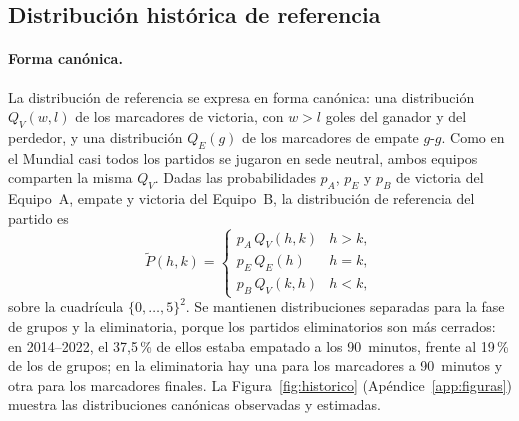 \documentclass[12pt]{article}
\theoremstyle{plain}
\theoremstyle{remark}
\begin{document}
\subsection{Distribución histórica de referencia}
\label{sec:historico}

\paragraph{Forma canónica.}
La distribución de referencia se expresa en forma canónica: una
distribución $Q_V(w, l)$ de los marcadores de victoria, con $w > l$
goles del ganador y del perdedor, y una distribución $Q_E(g)$ de los
marcadores de empate $g$-$g$.
Como en el Mundial casi todos los partidos se jugaron en sede neutral,
ambos equipos comparten la misma $Q_V$.
Dadas las probabilidades $p_A$, $p_E$ y $p_B$ de victoria del
Equipo~A, empate y victoria del Equipo~B, la distribución de
referencia del partido es
\begin{equation}
  \tilde{P}(h, k) =
  \begin{cases}
    p_A \, Q_V(h, k) & h > k, \\
    p_E \, Q_E(h)    & h = k, \\
    p_B \, Q_V(k, h) & h < k,
  \end{cases}
  \label{eq:referencia}
\end{equation}
sobre la cuadrícula $\{0, \ldots, 5\}^2$.
Se mantienen distribuciones separadas para la fase de grupos y la
eliminatoria, porque los partidos eliminatorios son más cerrados: en
2014--2022, el 37,5\,\% de ellos estaba empatado a los 90~minutos,
frente al 19\,\% de los de grupos; en la eliminatoria hay una para los
marcadores a 90~minutos y otra para los marcadores finales.
La Figura~\ref{fig:historico} (Apéndice~\ref{app:figuras}) muestra
las distribuciones canónicas
observadas y estimadas.
\end{document}
